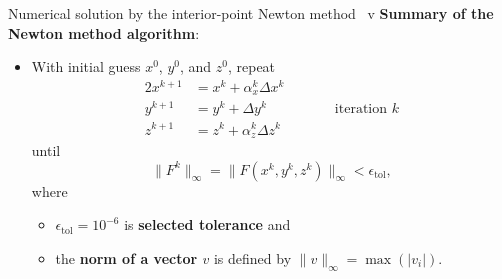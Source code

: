 \begin{frame}{Numerical solution by the interior-point Newton method \, v}
\vskip 10pt
\alert{\bf Summary of the Newton method algorithm}: \\[5pt]

\begin{itemize} 
%
\item With initial guess $x^{0}$, $y^{0}$, and $z^{0}$, repeat
%
\begin{alignat*}{2}
x^{k+1} & =x^{k}+\alpha_{x}^{k}\Delta x^{k}\\
y^{k+1} & =y^{k}+\Delta y^{k} & \qquad & \text{iteration }k\\
z^{k+1} & =z^{k}+\alpha_{z}^{k}\Delta z^{k}
\end{alignat*}
%
%
until
\[
\|F^{k}\|_{\infty}=\|F(x^{k},y^{k},z^{k})\|_{\infty}<\epsilon_{\mathrm{tol}},
\]
where
% 
\begin{itemize} 
\item $\epsilon_{\text{tol}}=10^{-6}$ is {\bf selected tolerance} and \item the {\bf norm of a vector $v$} is defined by
%
$
\|v\|_{\infty}=\max(|v_{i}|).
$
\end{itemize} 

\end{itemize} 

\end{frame}
